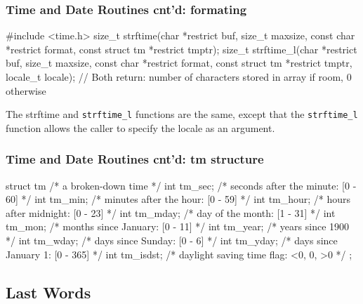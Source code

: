 \documentclass[newPxFont,sthlmFooter,nooffset]{beamer}
\begin{document}
\begin{frame}[containsverbatim,t]
  \frametitle{Time and Date Routines cnt'd: formating}

\begin{codedef}
#include <time.h>
size_t strftime(char *restrict buf, size_t maxsize, const char *restrict format, const struct tm *restrict tmptr);
size_t strftime_l(char *restrict buf, size_t maxsize, const char *restrict format, const struct tm *restrict tmptr, locale_t locale);
// Both return: number of characters stored in array if room, 0 otherwise
\end{codedef}

The strftime and \texttt{strftime\_l} functions are the same, except that the \texttt{strftime\_l} function allows the caller to specify the locale as an argument.

\end{frame}






\begin{frame}[containsverbatim,t]
  \frametitle{Time and Date Routines cnt'd: tm structure}

\begin{codedef}
struct tm {         /* a broken-down time */
     int  tm_sec;   /* seconds after the minute: [0 - 60] */
     int  tm_min;   /* minutes after the hour: [0 - 59] */
     int  tm_hour;  /* hours after midnight: [0 - 23] */
     int  tm_mday;  /* day of the month: [1 - 31] */
     int  tm_mon;   /* months since January: [0 - 11] */
     int  tm_year;  /* years since 1900 */
     int  tm_wday;  /* days since Sunday: [0 - 6] */
     int  tm_yday;  /* days since January 1: [0 - 365] */
     int  tm_isdst; /* daylight saving time flag: <0, 0, >0 */
};
\end{codedef}


\end{frame}





\subsection{Last Words}
\end{document}
